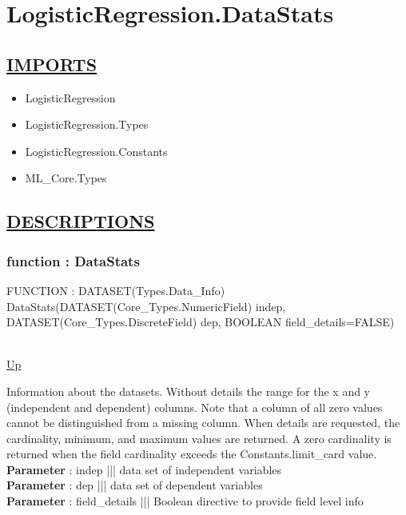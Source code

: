 \chapter*{LogisticRegression.DataStats}
\hypertarget{LogisticRegression.DataStats}{}

\section*{\underline{IMPORTS}}
\begin{itemize}
\item LogisticRegression
\item LogisticRegression.Types
\item LogisticRegression.Constants
\item ML\_Core.Types
\end{itemize}

\section*{\underline{DESCRIPTIONS}}
\subsection*{function : DataStats}
\hypertarget{ecldoc:logisticregression.datastats}{FUNCTION : DATASET(Types.Data\_Info) DataStats(DATASET(Core\_Types.NumericField) indep, DATASET(Core\_Types.DiscreteField) dep, BOOLEAN field\_details=FALSE)} \\
\hyperlink{ecldoc:}{Up} \\
\par
Information about the datasets. Without details the range for the x and y (independent and dependent) columns. Note that a column of all zero values cannot be distinguished from a missing column. When details are requested, the cardinality, minimum, and maximum values are returned. A zero cardinality is returned when the field cardinality exceeds the Constants.limit\_card value. \\
\textbf{Parameter} : indep ||| data set of independent variables \\
\textbf{Parameter} : dep ||| data set of dependent variables \\
\textbf{Parameter} : field\_details ||| Boolean directive to provide field level info \\

